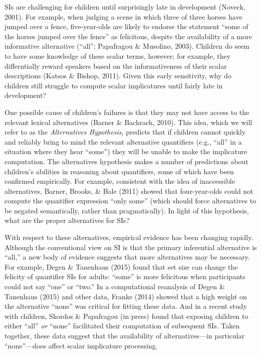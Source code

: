 \documentclass[10pt, letterpaper]{article}
\begin{document}
SIs are challenging for children until surprisingly late in development
(Noveck, 2001). For example, when judging a scene in which three of
three horses have jumped over a fence, five-year-olds are likely to
endorse the statement ``some of the horses jumped over the fence'' as
felicitous, despite the availability of a more informative alternative
(``all''; Papafragou \& Musolino, 2003). Children do seem to have some
knowledge of these scalar terms, however; for example, they
differntially reward speakers based on the informativeness of their
scalar descriptions (Katsos \& Bishop, 2011). Given this early
sensitivity, why do children still struggle to compute scalar
implicatures until fairly late in development?

One possible cause of children's failures is that they may not have
access to the relevant lexical alternatives (Barner \& Bachrach, 2010).
This idea, which we will refer to as the \emph{Alternatives Hypothesis},
predicts that if children cannot quickly and reliably bring to mind the
relevant alternative quantifiers (e.g., ``all'' in a situation where
they hear ``some'') they will be unable to make the implicature
computation. The alternatives hypothesis makes a number of predictions
about children's abilities in reasoning about quantifiers, some of which
have been confirmed empirically. For example, consistent with the idea
of inaccessible alternatives, Barner, Brooks, \& Bale (2011) showed that
four-year-olds could not compute the quantifier expression ``only some''
(which should force alternatives to be negated semantically, rather than
pragmatically). In light of this hypothesis, what are the proper
alternatives for SIs?

With respect to these alternatives, empirical evidence has been changing
rapidly. Although the conventional view on SI is that the primary
inferential alternative is ``all,'' a new body of evidence suggests that
more alternatives may be necessary. For example, Degen \& Tanenhaus
(2015) found that set size can change the felicity of quantifier SIs for
adults: ``some'' is more felicitous when participants could not say
``one'' or ``two.'' In a computational reanalysis of Degen \& Tanenhaus
(2015) and other data, Franke (2014) showed that a high weight on the
alternative ``none'' was critical for fitting these data. And in a
recent study with children, Skordos \& Papafragou (in press) found that
exposing children to either ``all'' \emph{or} ``none'' facilitated their
computation of subsequent SIs. Taken together, these data suggest that
the availability of alternatives---in particular ``none''---does affect
scalar implicature processing.
\end{document}
